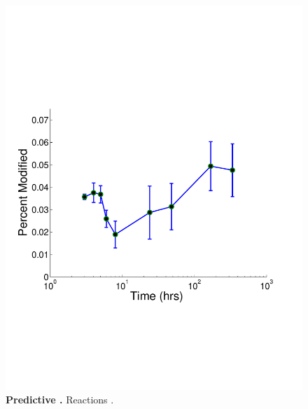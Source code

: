 \documentclass[12pt]{article}
\begin{document}
\clearpage
\begin{figure}[p]
\centerline{\includegraphics[width=5in]{Figures/Phosphorylations.pdf}}
\caption{\label{fig:carbon_network}\textbf{Predictive .} Reactions .}
\end{figure}
\end{document}
